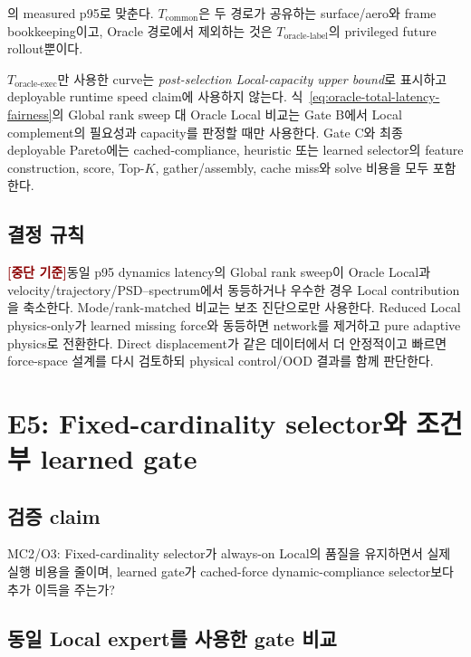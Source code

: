 \documentclass[11pt,a4paper]{article}
\newcommand{\killgate}{\textcolor{darkred}{\textbf{[중단 기준]}}}
\begin{document}
의 measured p95로 맞춘다. \(T_{\mathrm{common}}\)은 두 경로가 공유하는 surface/aero와
frame bookkeeping이고, Oracle 경로에서 제외하는 것은
\(T_{\mathrm{oracle\mbox{-}label}}\)의 privileged future rollout뿐이다.

\(T_{\mathrm{oracle\mbox{-}exec}}\)만 사용한 curve는
\emph{post-selection Local-capacity upper bound}로 표시하고 deployable runtime speed claim에 사용하지 않는다.
식~\eqref{eq:oracle-total-latency-fairness}의 Global rank sweep 대 Oracle Local 비교는
Gate B에서 Local complement의 필요성과 capacity를 판정할 때만 사용한다.
Gate C와 최종 deployable Pareto에는 cached-compliance, heuristic 또는 learned selector의
feature construction, score, Top-\(K\), gather/assembly, cache miss와 solve 비용을 모두 포함한다.

\subsection*{결정 규칙}

\killgate 동일 p95 dynamics latency의 Global rank sweep이 Oracle Local과
velocity/trajectory/PSD--spectrum에서 동등하거나 우수한 경우
Local contribution을 축소한다.
Mode/rank-matched 비교는 보조 진단으로만 사용한다.
Reduced Local physics-only가 learned missing force와 동등하면 network를 제거하고
pure adaptive physics로 전환한다.
Direct displacement가 같은 데이터에서 더 안정적이고 빠르면
force-space 설계를 다시 검토하되 physical control/OOD 결과를 함께 판단한다.

\section{E5: Fixed-cardinality selector와 조건부 learned gate}

\subsection*{검증 claim}

MC2/O3: Fixed-cardinality selector가 always-on Local의 품질을 유지하면서 실제 실행 비용을 줄이며,
learned gate가 cached-force dynamic-compliance selector보다 추가 이득을 주는가?

\subsection*{동일 Local expert를 사용한 gate 비교}
\end{document}
